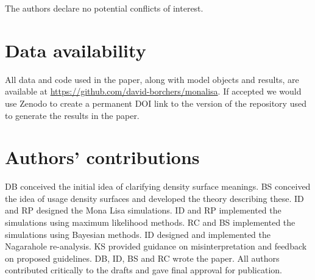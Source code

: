 \documentclass[10pt,a4paper]{article}
\begin{document}
The authors declare no potential conflicts of interest.

\section*{Data availability}

All data and code used in the paper, along with model objects and results, are available at \url{https://github.com/david-borchers/monalisa}. If accepted we would use Zenodo to create a permanent DOI link to the version of the repository used to generate the results in the paper.

\section*{Authors' contributions} 
DB conceived the initial idea of clarifying density surface meanings. BS conceived the idea of usage density surfaces and developed the theory describing these. ID and RP designed the Mona Lisa simulations. ID and RP implemented the simulations using maximum likelihood methods. RC and BS implemented the simulations using Bayesian methods. ID designed and implemented the Nagarahole re-analysis. KS provided guidance on misinterpretation and feedback on proposed guidelines. DB, ID, BS and RC wrote the paper. All authors contributed critically to the drafts and gave final approval for publication.



\end{document}
